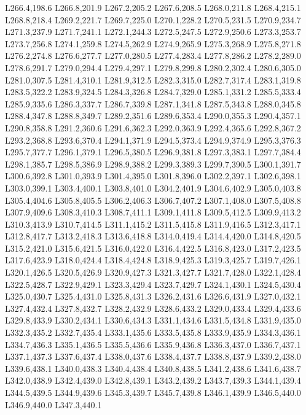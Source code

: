 		L266.4,198.6 L266.8,201.9 L267.2,205.2 L267.6,208.5 L268.0,211.8 L268.4,215.1 L268.8,218.4 L269.2,221.7
		L269.7,225.0 L270.1,228.2 L270.5,231.5 L270.9,234.7 L271.3,237.9 L271.7,241.1 L272.1,244.3 L272.5,247.5
		L272.9,250.6 L273.3,253.7 L273.7,256.8 L274.1,259.8 L274.5,262.9 L274.9,265.9 L275.3,268.9 L275.8,271.8
		L276.2,274.8 L276.6,277.7 L277.0,280.5 L277.4,283.4 L277.8,286.2 L278.2,289.0 L278.6,291.7 L279.0,294.4
		L279.4,297.1 L279.8,299.8 L280.2,302.4 L280.6,305.0 L281.0,307.5 L281.4,310.1 L281.9,312.5 L282.3,315.0
		L282.7,317.4 L283.1,319.8 L283.5,322.2 L283.9,324.5 L284.3,326.8 L284.7,329.0 L285.1,331.2 L285.5,333.4
		L285.9,335.6 L286.3,337.7 L286.7,339.8 L287.1,341.8 L287.5,343.8 L288.0,345.8 L288.4,347.8 L288.8,349.7
		L289.2,351.6 L289.6,353.4 L290.0,355.3 L290.4,357.1 L290.8,358.8 L291.2,360.6 L291.6,362.3 L292.0,363.9
		L292.4,365.6 L292.8,367.2 L293.2,368.8 L293.6,370.4 L294.1,371.9 L294.5,373.4 L294.9,374.9 L295.3,376.3
		L295.7,377.7 L296.1,379.1 L296.5,380.5 L296.9,381.8 L297.3,383.1 L297.7,384.4 L298.1,385.7 L298.5,386.9
		L298.9,388.2 L299.3,389.3 L299.7,390.5 L300.1,391.7 L300.6,392.8 L301.0,393.9 L301.4,395.0 L301.8,396.0
		L302.2,397.1 L302.6,398.1 L303.0,399.1 L303.4,400.1 L303.8,401.0 L304.2,401.9 L304.6,402.9 L305.0,403.8
		L305.4,404.6 L305.8,405.5 L306.2,406.3 L306.7,407.2 L307.1,408.0 L307.5,408.8 L307.9,409.6 L308.3,410.3
		L308.7,411.1 L309.1,411.8 L309.5,412.5 L309.9,413.2 L310.3,413.9 L310.7,414.5 L311.1,415.2 L311.5,415.8
		L311.9,416.5 L312.3,417.1 L312.8,417.7 L313.2,418.3 L313.6,418.8 L314.0,419.4 L314.4,420.0 L314.8,420.5
		L315.2,421.0 L315.6,421.5 L316.0,422.0 L316.4,422.5 L316.8,423.0 L317.2,423.5 L317.6,423.9 L318.0,424.4
		L318.4,424.8 L318.9,425.3 L319.3,425.7 L319.7,426.1 L320.1,426.5 L320.5,426.9 L320.9,427.3 L321.3,427.7
		L321.7,428.0 L322.1,428.4 L322.5,428.7 L322.9,429.1 L323.3,429.4 L323.7,429.7 L324.1,430.1 L324.5,430.4
		L325.0,430.7 L325.4,431.0 L325.8,431.3 L326.2,431.6 L326.6,431.9 L327.0,432.1 L327.4,432.4 L327.8,432.7
		L328.2,432.9 L328.6,433.2 L329.0,433.4 L329.4,433.6 L329.8,433.9 L330.2,434.1 L330.6,434.3 L331.1,434.6
		L331.5,434.8 L331.9,435.0 L332.3,435.2 L332.7,435.4 L333.1,435.6 L333.5,435.8 L333.9,435.9 L334.3,436.1
		L334.7,436.3 L335.1,436.5 L335.5,436.6 L335.9,436.8 L336.3,437.0 L336.7,437.1 L337.1,437.3 L337.6,437.4
		L338.0,437.6 L338.4,437.7 L338.8,437.9 L339.2,438.0 L339.6,438.1 L340.0,438.3 L340.4,438.4 L340.8,438.5
		L341.2,438.6 L341.6,438.7 L342.0,438.9 L342.4,439.0 L342.8,439.1 L343.2,439.2 L343.7,439.3 L344.1,439.4
		L344.5,439.5 L344.9,439.6 L345.3,439.7 L345.7,439.8 L346.1,439.9 L346.5,440.0 L346.9,440.0 L347.3,440.1
